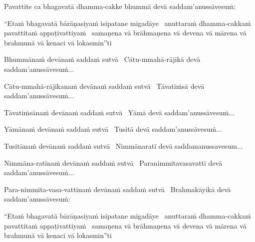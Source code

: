 \begin{pali-hang}
  Pavattite ca bhagavatā dhamma-cakke bhummā devā saddam'anussāvesuṁ:
\end{pali-hang}

\begin{pali-hang}
  ``Etaṁ bhagavatā bārāṇasiyaṁ isipatane migadāye \breathmark\ anuttaraṁ dhamma-cakkaṁ pavattitaṁ appaṭivattiyaṁ \breathmark\ samaṇena vā brāhmaṇena vā devena vā mārena vā brahmunā vā kenaci vā lokasmin''ti
\end{pali-hang}

\begin{pali-hang}
  Bhummānaṁ devānaṁ saddaṁ sutvā \breathmark\ Cātu-mmahā-rājikā devā saddam'anussāvesuṁ...
\end{pali-hang}

\begin{pali-hang}
  Cātu-mmahā-rājikanaṁ devānaṁ saddaṁ sutvā \breathmark\ Tāvatiṁsā devā saddam'anussāvesuṁ...
\end{pali-hang}

\begin{pali-hang}
  Tāvatiṁsānaṁ devānaṁ saddaṁ sutvā \breathmark\ Yāmā devā saddam'anussāvesuṁ...
\end{pali-hang}

\begin{pali-hang}
  Yāmānaṁ devānaṁ saddaṁ sutvā \breathmark\ Tusitā devā saddam'anussāvesuṁ...
\end{pali-hang}

\begin{pali-hang}
  Tusitānaṁ devānaṁ saddaṁ sutvā \breathmark\ Nimmānaratī devā saddamanussavesum...
\end{pali-hang}

\begin{pali-hang}
  Nimmāna-ratīnaṁ devānaṁ saddaṁ sutvā \breathmark\ Paranimmitavasavattī devā saddam'anussāvesuṁ...
\end{pali-hang}

\begin{pali-hang}
  Para-nimmita-vasa-vattīnaṁ devānaṁ saddaṁ sutvā \breathmark\ Brahmakāyikā devā saddam'anussāvesuṁ:
\end{pali-hang}

\begin{pali-hang}
  ``Etaṁ bhagavatā bārāṇasiyaṁ isipatane migadāye \breathmark\ anuttaraṁ dhamma-cakkaṁ pavattitaṁ appaṭivattiyaṁ \breathmark\ samaṇena vā brāhmaṇena vā devena vā mārena vā brahmunā vā kenaci vā lokasmin''ti
\end{pali-hang}

